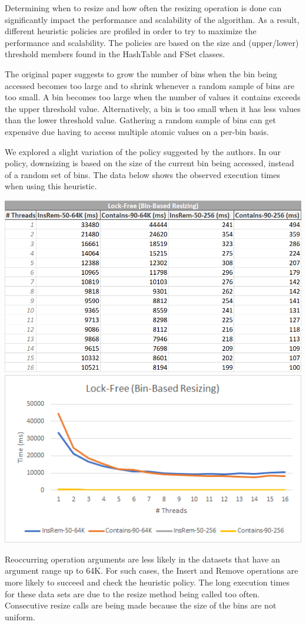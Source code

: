 \documentclass[11pt]{article} %
\begin{document}
Determining when to resize and how often the resizing operation is done can significantly impact the performance and scalability of the algorithm. As a result, different heuristic policies are profiled in order to try to maximize the performance and scalability. The policies are based on the size and (upper/lower) threshold members found in the HashTable and FSet classes.

The original paper suggests to grow the number of bins when the bin being accessed becomes too large and to shrink whenever a random sample of bins are too small. A bin becomes too large when the number of values it contains exceeds the upper threshold value. Alternatively, a bin is too small when it has less values than the lower threshold value. Gathering a random sample of bins can get expensive due having to access multiple atomic values on a per-bin basis.

We explored a slight variation of the policy suggested by the authors. In our policy, downsizing is based on the size of the current bin being accessed, instead of a random set of bins. The data below shows the observed execution times when using this heuristic.

\bigskip
\includegraphics[width=0.5\linewidth]{TableA.png}
\includegraphics[width=0.5\linewidth]{GraphA.png}

Reoccurring operation arguments are less likely in the datasets that have an argument range up to 64K. For such cases, the Insert and Remove operations are more likely to succeed and check the heuristic policy. The long execution times for these data sets are due to the resize method being called too often. Consecutive resize calls are being made because the size of the bins are not uniform.
\end{document}
